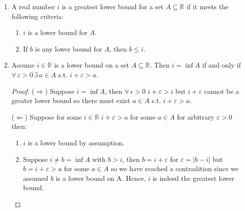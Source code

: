 \begin{enumerate}[label=(\alph*)]
    \item 
    \begin{definition}
        A real number $i$ is a greatest lower bound for a set $A \subseteq \mathbb{R}$ if it meets the following criteria:
        \begin{enumerate}[label=(\roman*)]
            \item $i$ is a lower bound for $A$.
            \item If $b$ is any lower bound for $A$, then $b \leq i $.
        \end{enumerate}
    \end{definition}

    \item
    \begin{lemma}
        Assume $i \in \mathbb{R}$ is a lower bound on a set $A \subseteq \mathbb{R}$. 
        Then $i = \inf A$ if and only if $\forall \, \varepsilon > 0 \, \exists \, a \in A $
        s.t. $i + \varepsilon > a$.  
    \end{lemma}

    \begin{proof}
        ($\Rightarrow$) Suppose $i = \inf A$, then $\forall \, \epsilon > 0 $ $ i+\varepsilon > i$
        but $i+\varepsilon$ cannot be a greater lower bound so there must exist $a \in A$ s.t. $i+\varepsilon > a$.

        ($\Leftarrow$) Suppose for some $i \in \mathbb{R}$ $i+\varepsilon > a$ for some $a \in A $ for arbitrary $ \varepsilon > 0$ then:
        \begin{enumerate}[label=(\roman*)]
            \item $i$ is a lower bound by assumption.
            \item Suppose $i \neq b = \inf A$ with $b>i$, then $b = i + \varepsilon$ for 
            $\varepsilon = |b - i|$ but $b =  i + \varepsilon > a$ for some $a \in A$ so
            we have reached a contradition since we assumed $b$ is a lower bound on A.
            Hence, $i$ is indeed the greatest lower bound.
        \end{enumerate}
    \end{proof}
\end{enumerate}


